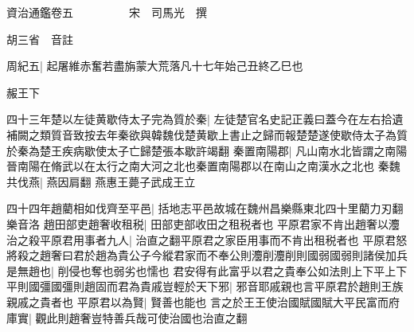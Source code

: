 資治通鑑卷五　　　　　宋　司馬光　撰

胡三省　音註

周紀五|{
	起屠維赤奮若盡旃蒙大荒落凡十七年始己丑終乙巳也}


赧王下

四十三年楚以左徒黄歇侍太子完為質於秦|{
	左徒楚官名史記正義曰蓋今在左右拾遺補闕之類質音致按去年秦欲與韓魏伐楚黄歇上書止之歸而報楚楚遂使歇侍太子為質於秦為楚王疾病歇使太子亡歸楚張本歇許竭翻}
秦置南陽郡|{
	凡山南水北皆謂之南陽晉南陽在脩武以在太行之南大河之北也秦置南陽郡以在南山之南漢水之北也}
秦魏共伐燕|{
	燕因肩翻}
燕惠王薨子武成王立

四十四年趙藺相如伐齊至平邑|{
	括地志平邑故城在魏州昌樂縣東北四十里藺力刃翻樂音洛}
趙田部吏趙奢收租税|{
	田部吏部收田之租税者也}
平原君家不肯出趙奢以灋治之殺平原君用事者九人|{
	治直之翻平原君之家臣用事而不肯出租税者也}
平原君怒將殺之趙奢曰君於趙為貴公子今縱君家而不奉公則灋削灋削則國弱國弱則諸侯加兵是無趙也|{
	削侵也奪也弱劣也懦也}
君安得有此富乎以君之貴奉公如法則上下平上下平則國彊國彊則趙固而君為貴戚豈輕於天下邪|{
	邪音耶戚親也言平原君於趙則王族親戚之貴者也}
平原君以為賢|{
	賢善也能也}
言之於王王使治國賦國賦大平民富而府庫實|{
	觀此則趙奢豈特善兵哉可使治國也治直之翻}


